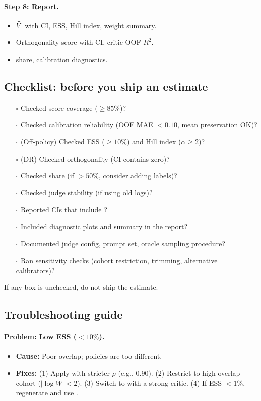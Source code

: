 \paragraph{Step 8: Report.}
\begin{itemize}
\item $\widehat{V}$ with CI, ESS, Hill index, weight summary.
\item Orthogonality score with CI, critic OOF $R^2$.
\item \oua{} share, calibration diagnostics.
\end{itemize}

\subsection{Checklist: before you ship an estimate}

\begin{enumerate}
\item[$\square$] Checked score coverage ($\ge 85\%$)?
\item[$\square$] Checked calibration reliability (OOF MAE $< 0.10$, mean preservation OK)?
\item[$\square$] (Off-policy) Checked ESS ($\ge 10\%$) and Hill index ($\alpha \ge 2$)?
\item[$\square$] (DR) Checked orthogonality (CI contains zero)?
\item[$\square$] Checked \oua{} share (if $> 50\%$, consider adding labels)?
\item[$\square$] Checked judge stability (if using old logs)?
\item[$\square$] Reported CIs that include \oua?
\item[$\square$] Included diagnostic plots and summary in the report?
\item[$\square$] Documented judge config, prompt set, oracle sampling procedure?
\item[$\square$] Ran sensitivity checks (cohort restriction, trimming, alternative calibrators)?
\end{enumerate}

If any box is unchecked, do not ship the estimate.

\subsection{Troubleshooting guide}

\paragraph{Problem: Low ESS ($< 10\%$).}
\begin{itemize}
\item \textbf{Cause:} Poor overlap; policies are too different.
\item \textbf{Fixes:} (1) Apply \simcal{} with stricter $\rho$ (e.g., 0.90). (2) Restrict to high-overlap cohort ($|\log W| < 2$). (3) Switch to \dr{} with a strong critic. (4) If ESS $< 1\%$, regenerate and use \dm.
\end{itemize}

